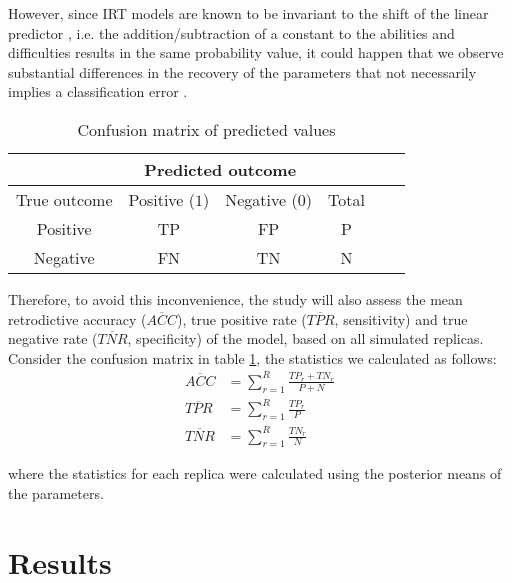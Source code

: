 However, since IRT models are known to be invariant to the shift of the linear predictor \cite{Baker_et_al_1992, Bock_1972}, i.e. the addition/subtraction of a constant to the abilities and difficulties results in the same probability value, it could happen that we observe substantial differences in the recovery of the parameters that not necessarily implies a classification error  \cite{Wollack_2002}. 
%
\begin{table}[!h]
	\centering
	\begin{tabular}{ c|c|c|cc|c| } 
		& \multicolumn{2}{c}{Predicted outcome} \\
		\hline
		\hline
		True outcome 	& Positive ($1$) 	& Negative ($0$) 	& Total \\
		\hline
		\hline
		Positive 		& TP 				& FP 				& P \\ 
		Negative 		& FN 				& TN 				& N \\ 
	\end{tabular}
	\caption{Confusion matrix of predicted values}
	\label{tab:confusion_matrix}
\end{table}

Therefore, to avoid this inconvenience, the study will also assess the mean retrodictive accuracy ($\overline{ACC}$), true positive rate ($\overline{TPR}$, sensitivity) and true negative rate ($\overline{TNR}$, specificity) of the model, based on all simulated replicas. Consider the confusion matrix in table \ref{tab:confusion_matrix}, the statistics we calculated as follows:
%
\begin{align}
	\overline{ACC} &= \sum_{r=1}^{R} \frac{TP_{r} + TN_{r}}{ P + N} \\
	\overline{TPR} &= \sum_{r=1}^{R} \frac{TP_{r}}{P} \\
	\overline{TNR} &= \sum_{r=1}^{R} \frac{TN_{r}}{N}
\end{align}

\noindent where the statistics for each replica were calculated using the posterior means of the parameters.


\section{Results}

